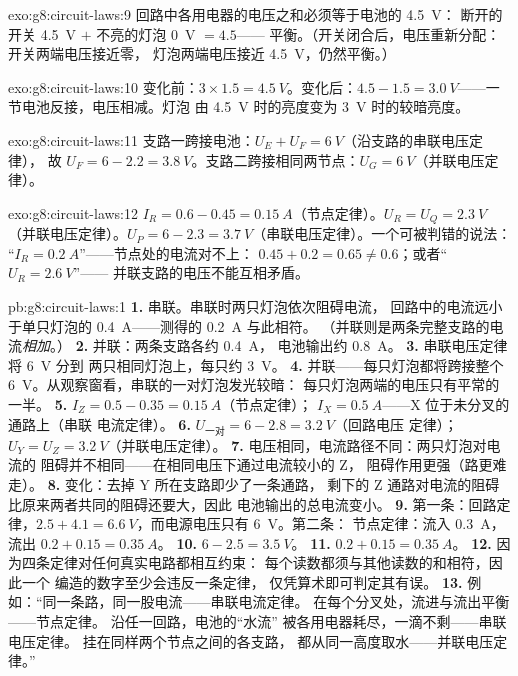 \begin{solution}{exo:g8:circuit-laws:9}
回路中各用电器的电压之和必须等于电池的 \qty{4.5}{V}：
断开的开关 \qty{4.5}{V} $+$ 不亮的灯泡 \qty{0}{V} $= 4.5$——
平衡。（开关闭合后，电压重新分配：开关两端电压接近零，
灯泡两端电压接近 \qty{4.5}{V}，仍然平衡。）
\end{solution}

\begin{solution}{exo:g8:circuit-laws:10}
变化前：$3 \times 1.5 = \qty{4.5}{V}$。变化后：$4.5 - 1.5 =
\qty{3.0}{V}$——一节电池反接，电压相减。灯泡
由 \qty{4.5}{V} 时的亮度变为 \qty{3}{V} 时的较暗亮度。
\end{solution}

\begin{solution}{exo:g8:circuit-laws:11}
支路一跨接电池：$U_E + U_F = \qty{6}{V}$（沿支路的串联电压定律），
故 $U_F = 6 - 2.2 =
\qty{3.8}{V}$。支路二跨接相同两节点：$U_G =
\qty{6}{V}$（并联电压定律）。
\end{solution}

\begin{solution}{exo:g8:circuit-laws:12}
$I_R = 0.6 - 0.45 = \qty{0.15}{A}$（节点定律）。$U_R = U_Q
= \qty{2.3}{V}$（并联电压定律）。$U_P = 6 - 2.3 =
\qty{3.7}{V}$（串联电压定律）。一个可被判错的说法：
“$I_R = \qty{0.2}{A}$”——节点处的电流对不上：
$0.45 + 0.2 = 0.65 \neq 0.6$；或者“$U_R = \qty{2.6}{V}$”——
并联支路的电压不能互相矛盾。
\end{solution}

\begin{solution}{pb:g8:circuit-laws:1}
\textbf{1.} 串联。串联时两只灯泡依次阻碍电流，
回路中的电流远小于单只灯泡的
\qty{0.4}{A}——测得的 \qty{0.2}{A} 与此相符。
（并联则是两条完整支路的电流\emph{相加}。）
\textbf{2.} 并联：两条支路各约 \qty{0.4}{A}，
电池输出约 \qty{0.8}{A}。
\textbf{3.} 串联电压定律将 \qty{6}{V} 分到
两只相同灯泡上，每只约 \qty{3}{V}。
\textbf{4.} 并联——每只灯泡都将跨接整个
\qty{6}{V}。从观察窗看，串联的一对灯泡发光较暗：
每只灯泡两端的电压只有平常的一半。
\textbf{5.} $I_Z = 0.5 - 0.35 = \qty{0.15}{A}$（节点定律）；
$I_X = \qty{0.5}{A}$——X 位于未分叉的通路上（串联
电流定律）。
\textbf{6.} $U_{\text{一对}} = 6 - 2.8 = \qty{3.2}{V}$（回路电压
定律）；$U_Y = U_Z = \qty{3.2}{V}$（并联电压定律）。
\textbf{7.} 电压相同，电流路径不同：两只灯泡对电流的
阻碍并不相同——在相同电压下通过电流较小的 Z，
阻碍作用更强（路更难走）。
\textbf{8.} 变化：去掉 Y 所在支路即少了一条通路，
剩下的 Z 通路对电流的阻碍比原来两者共同的阻碍还要大，因此
电池输出的总电流变小。
\textbf{9.} 第一条：回路定律，$2.5 + 4.1 =
\qty{6.6}{V}$，而电源电压只有 \qty{6}{V}。第二条：
节点定律：流入 \qty{0.3}{A}，流出 $0.2 + 0.15 =
\qty{0.35}{A}$。
\textbf{10.} $6 - 2.5 = \qty{3.5}{V}$。
\textbf{11.} $0.2 + 0.15 = \qty{0.35}{A}$。
\textbf{12.} 因为四条定律对任何真实电路都相互约束：
每个读数都须与其他读数的和相符，因此一个
编造的数字至少会违反一条定律，
仅凭算术即可判定其有误。
\textbf{13.} 例如：“同一条路，同一股电流——串联电流定律。
在每个分叉处，流进与流出平衡——节点定律。
沿任一回路，电池的“水流”
被各用电器耗尽，一滴不剩——串联电压定律。
挂在同样两个节点之间的各支路，
都从同一高度取水——并联电压定律。”
\end{solution}
